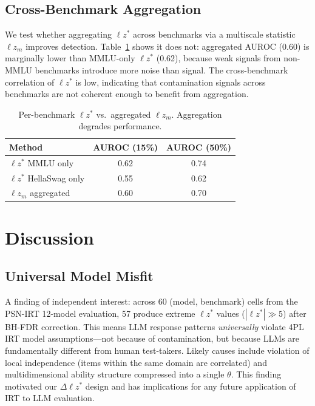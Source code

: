 \documentclass[11pt,a4paper]{article}
\newcommand{\lzstar}{\ensuremath{\ell z^*}}
\begin{document}
\subsection{Cross-Benchmark Aggregation}
\label{sec:lzm}

We test whether aggregating $\lzstar$ across benchmarks via a multiscale statistic $\ell z_m$ improves detection.
Table~\ref{tab:lzm} shows it does not: aggregated AUROC (0.60) is marginally lower than MMLU-only $\lzstar$ (0.62), because weak signals from non-MMLU benchmarks introduce more noise than signal.
The cross-benchmark correlation of $\lzstar$ is low, indicating that contamination signals across benchmarks are not coherent enough to benefit from aggregation.

\begin{table}[t]
\centering
\small
\caption{Per-benchmark $\lzstar$ vs.\ aggregated $\ell z_m$. Aggregation degrades performance.}
\label{tab:lzm}
\begin{tabular}{lcc}
\toprule
\textbf{Method} & \textbf{AUROC (15\%)} & \textbf{AUROC (50\%)} \\
\midrule
$\lzstar$ MMLU only & 0.62 & 0.74 \\
$\lzstar$ HellaSwag only & 0.55 & 0.62 \\
$\ell z_m$ aggregated & 0.60 & 0.70 \\
\bottomrule
\end{tabular}
\end{table}

\section{Discussion}

\subsection{Universal Model Misfit}
\label{sec:universal_misfit}

A finding of independent interest: across 60 (model, benchmark) cells from the PSN-IRT 12-model evaluation, 57 produce extreme $\lzstar$ values ($|\lzstar| \gg 5$) after BH-FDR correction.
This means LLM response patterns \emph{universally} violate 4PL IRT model assumptions---not because of contamination, but because LLMs are fundamentally different from human test-takers.
Likely causes include violation of local independence (items within the same domain are correlated) and multidimensional ability structure compressed into a single $\theta$.
This finding motivated our $\Delta\lzstar$ design and has implications for any future application of IRT to LLM evaluation.
\end{document}
